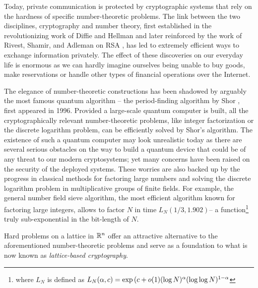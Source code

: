Today, private communication is protected by cryptographic systems that rely on the hardness of specific number-theoretic problems. The link between the two disciplines, cryptography and number theory, first established in the revolutionizing work of Diffie and Hellman \cite{DH76} and later reinforced by the work of Rivest, Shamir, and Adleman on RSA \cite{RSA78}, has led to extremely efficient ways to exchange information privately. The effect of these discoveries on our everyday life is enormous as we can hardly imagine ourselves being unable to buy goods, make reservations or handle other types of financial operations over the Internet.  

The elegance of number-theoretic constructions has been shadowed by arguably the most famous quantum algorithm -- the period-finding algorithm by Shor \cite{Shor97}, first appeared in 1996. Provided a large-scale quantum computer is built, all the cryptographically relevant number-theoretic problems, like integer factorization or the discrete logarithm problem, can be efficiently solved by Shor's algorithm. The existence of such a quantum computer may look unrealistic today as there are several serious obstacles on the way to build a quantum device that could be of any threat to our modern cryptosystems; yet many concerns have been raised on the security of the deployed systems. These worries are also backed up by the progress in classical methods for factoring large numbers and solving the discrete logarithm problem in multiplicative groups of finite fields. For example, the general number field sieve algorithm, the most efficient algorithm known for factoring large integers, allows to factor $N$ in time $L_N(1/3, 1.902)$-- a function\footnote{where $L_N$ is defined as $L_N(\alpha, c) = \exp{(c+o(1) (\log N )^{\alpha} (\log \log N)^{1-\alpha}}$}  truly sub-exponential in the bit-length of $N$.

Hard problems on a lattice in ${{\mathbb R}}^n$ offer an attractive alternative to the aforementioned number-theoretic problems and serve as a foundation to what is now known as \emph{lattice-based cryptography}. 



